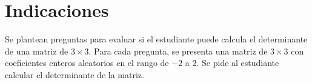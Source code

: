 \documentclass[a4,11pt]{aleph-notas}
\begin{document}
\encabezado

\vspace*{-8mm}
\section{Indicaciones}

Se plantean preguntas para evaluar si el estudiante puede calcula el determinante de una matriz de $3 \times 3$. Para cada pregunta, se presenta una matriz de $3 \times 3$ con coeficientes enteros aleatorios en el rango de $-2$ a $2$. Se pide al estudiante calcular el determinante de la matriz.




\end{document}
